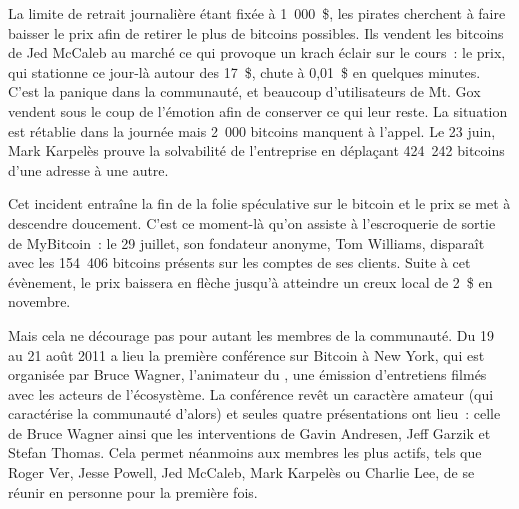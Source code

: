 La limite de retrait journalière étant fixée à 1~000~\$, les pirates cherchent à faire baisser le prix afin de retirer le plus de bitcoins possibles. Ils vendent les bitcoins de Jed McCaleb au marché ce qui provoque un krach éclair sur le cours~: le prix, qui stationne ce jour-là autour des 17~\$, chute à 0,01~\$ en quelques minutes. C'est la panique dans la communauté, et beaucoup d'utilisateurs de Mt. Gox vendent sous le coup de l'émotion afin de conserver ce qui leur reste. La situation est rétablie dans la journée mais 2~000 bitcoins manquent à l'appel. Le 23 juin, Mark Karpelès prouve la solvabilité de l'entreprise en déplaçant 424~242 bitcoins d'une adresse à une autre.

Cet incident entraîne la fin de la folie spéculative sur le bitcoin et le prix se met à descendre doucement. C'est ce moment-là qu'on assiste à l'escroquerie de sortie de MyBitcoin~: le 29 juillet, son fondateur anonyme, Tom Williams, disparaît avec les 154~406 bitcoins présents sur les comptes de ses clients. Suite à cet évènement, le prix baissera en flèche jusqu'à atteindre un creux local de 2~\$ en novembre.


Mais cela ne décourage pas pour autant les membres de la communauté. Du 19 au 21 août 2011 a lieu la première conférence sur Bitcoin à New York, qui est organisée par Bruce Wagner, l'animateur du , une émission d'entretiens filmés avec les acteurs de l'écosystème. La conférence revêt un caractère amateur (qui caractérise la communauté d'alors) et seules quatre présentations ont lieu~: celle de Bruce Wagner ainsi que les interventions de Gavin Andresen, Jeff Garzik et Stefan Thomas. Cela permet néanmoins aux membres les plus actifs, tels que Roger Ver, Jesse Powell, Jed McCaleb, Mark Karpelès ou Charlie Lee, de se réunir en personne pour la première fois.

